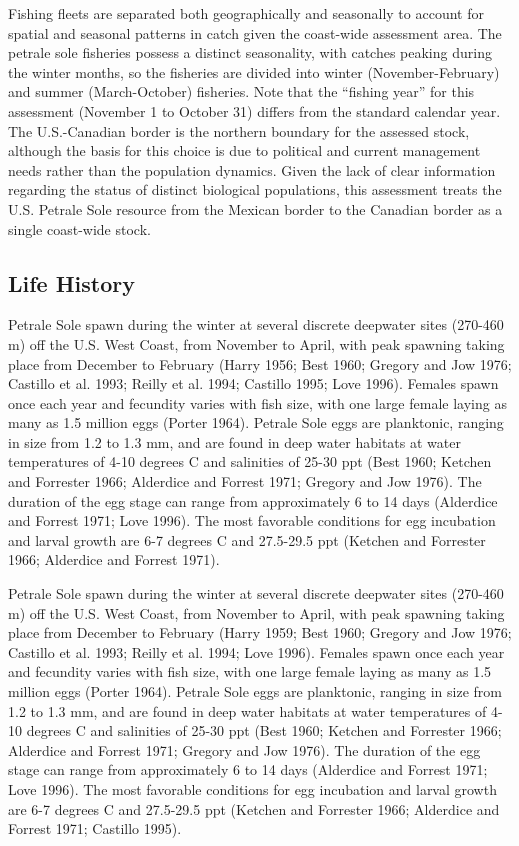 \documentclass[11pt,
  english,
  letterpaper,
]{article}
\begin{document}
Fishing fleets are separated both geographically and seasonally to account for spatial and seasonal patterns in catch given the coast-wide assessment area. The petrale sole fisheries possess a distinct seasonality, with catches peaking during the winter months, so the fisheries are divided into winter (November-February) and summer (March-October) fisheries. Note that the ``fishing year'' for this assessment (November 1 to October 31) differs from the standard calendar year. The U.S.-Canadian border is the northern boundary for the assessed stock, although the basis for this choice is due to political and current management needs rather than the population dynamics. Given the lack of clear information regarding the status of distinct biological populations, this assessment treats the U.S. Petrale Sole resource from the Mexican border to the Canadian border as a single coast-wide stock.

\hypertarget{life-history}{%
\subsection{Life History}\label{life-history}}

Petrale Sole spawn during the winter at several discrete deepwater sites (270-460 m) off the U.S. West Coast, from November to April, with peak spawning taking place from December to February (Harry 1956; Best 1960; Gregory and Jow 1976; Castillo et al. 1993; Reilly et al. 1994; Castillo 1995; Love 1996). Females spawn once each year and fecundity varies with fish size, with one large female laying as many as 1.5 million eggs (Porter 1964). Petrale Sole eggs are planktonic, ranging in size from 1.2 to 1.3 mm, and are found in deep water habitats at water temperatures of 4-10 degrees C and salinities of 25-30 ppt (Best 1960; Ketchen and Forrester 1966; Alderdice and Forrest 1971; Gregory and Jow 1976). The duration of the egg stage can range from approximately 6 to 14 days (Alderdice and Forrest 1971; Love 1996). The most favorable conditions for egg incubation and larval growth are 6-7 degrees C and 27.5-29.5 ppt (Ketchen and Forrester 1966; Alderdice and Forrest 1971).

Petrale Sole spawn during the winter at several discrete deepwater sites (270-460 m) off the U.S. West Coast, from November to April, with peak spawning taking place from December to February (Harry 1959; Best 1960; Gregory and Jow 1976; Castillo et al. 1993; Reilly et al. 1994; Love 1996). Females spawn once each year and fecundity varies with fish size, with one large female laying as many as 1.5 million eggs (Porter 1964). Petrale Sole eggs are planktonic, ranging in size from 1.2 to 1.3 mm, and are found in deep water habitats at water temperatures of 4-10 degrees C and salinities of 25-30 ppt (Best 1960; Ketchen and Forrester 1966; Alderdice and Forrest 1971; Gregory and Jow 1976). The duration of the egg stage can range from approximately 6 to 14 days (Alderdice and Forrest 1971; Love 1996). The most favorable conditions for egg incubation and larval growth are 6-7 degrees C and 27.5-29.5 ppt (Ketchen and Forrester 1966; Alderdice and Forrest 1971; Castillo 1995).
\end{document}
